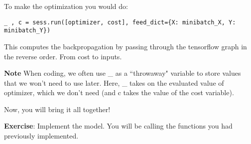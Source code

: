 To make the optimization you would do:
\begin{verbatim}
_ , c = sess.run([optimizer, cost], feed_dict={X: minibatch_X, Y: minibatch_Y})
\end{verbatim} 

This computes the backpropagation by passing through the tensorflow graph in the reverse order. From cost to inputs.


{\textbf{Note}} When coding, we often use \_ as a ``throwaway" variable to store values that we won't need to use later. Here, \_ takes on the evaluated value of optimizer, which we don't need (and c takes the value of the cost variable).




Now, you will bring it all together!

{\textbf{Exercise}}: Implement the model. You will be calling the functions you had previously implemented.



